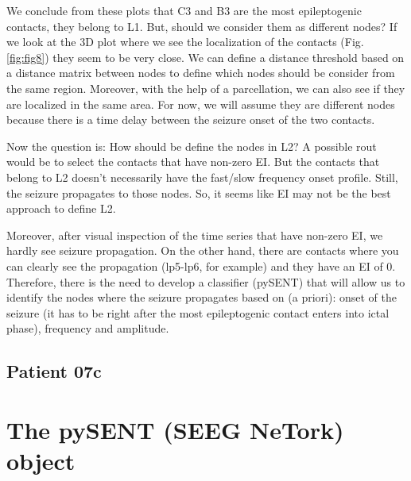 \documentclass[11pt,oneside]{amsart}
\begin{document}
We conclude from these plots that C3 and B3 are the most epileptogenic contacts, they belong to L1. But, should we consider them as different nodes? If we look at the 3D plot where we see the localization of the contacts (Fig. \ref{fig:fig8}) they seem to be very close. We can define a distance threshold based on a distance matrix between nodes to define which nodes should be consider from the same region. Moreover, with the help of a parcellation, we can also see if they are localized in the same area. For now, we will assume they are different nodes because there is a time delay between the seizure onset of the two contacts.

Now the question is: How should be define the nodes in L2? A possible rout would be to select the contacts that have non-zero EI. But the contacts that belong to L2 doesn't necessarily have the fast/slow frequency onset profile. Still, the seizure propagates to those nodes. So, it seems like EI may not be the best approach to define L2. 

Moreover, after visual inspection of the time series that have non-zero EI, we hardly see seizure propagation. On the other hand, there are contacts where you can clearly see the propagation (lp5-lp6, for example) and they have an EI of 0. Therefore, there is the need to develop a classifier (pySENT) that will allow us to identify the nodes where the seizure propagates based on (a priori): onset of the seizure (it has to be right after the most epileptogenic contact enters into ictal phase), frequency and amplitude.

\subsection{Patient 07c}


\section{The pySENT (SEEG NeTork) object}
  
  
\end{document}
